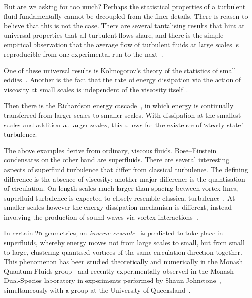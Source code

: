 But are we asking for too much? Perhaps the statistical properties of a turbulent fluid fundamentally cannot be decoupled from the finer details. There is reason to believe that this is not the case. There are several tantalising results that hint at universal properties that all turbulent flows share, and there is the simple empirical observation that the average flow of turbulent fluids at large scales is reproducible from one experimental run to the next~\cite[pp 13, 86]{davidson_turbulence:_2004}.

One of these universal results is Kolmogorov's theory of the statistics of small eddies~\cite{kolmogorov_local_1941, spalding_kolmogorovs_1991}. Another is the fact that the rate of energy dissipation via the action of viscosity at small scales is independent of the viscosity itself~\cite[p 77]{davidson_turbulence:_2004}.

Then there is the Richardson energy cascade~\cite{richardson_weather_2007}, in which energy is continually transferred from larger scales to smaller scales. With dissipation at the smallest scales and addition at larger scales, this allows for the existence of `steady state' turbulence.

The above examples derive from ordinary, viscous fluids. Bose--Einstein condensates on the other hand are superfluids. There are several interesting aspects of superfluid turbulence that differ from classical turbulence. The defining difference is the absence of viscosity; another major difference is the quantisation of circulation. On length scales much larger than spacing between vortex lines, superfluid turbulence is expected to closely resemble classical turbulence~\cite{tsubota_energy_2009}. At smaller scales however the energy dissipation mechanism is different, instead involving the production of sound waves via vortex interactions~\cite{tsubota_energy_2009, vinen_how_2005}.

In certain 2\textsc{d} geometries, an \emph{inverse cascade}~\cite{onsager_statistical_1949, kraichnan_inertial_1967} is predicted to take place in superfluids, whereby energy moves not from large scales to small, but from small to large, clustering quantised vortices of the same circulation direction together. This phenomenon has been studied theoretically and numerically in the Monash Quantum Fluids group~\cite{simula_emergence_2014, groszek_vortex_2018} and recently experimentally observed in the Monash Dual-Species laboratory in experiments performed by Shaun Johnstone~\cite{johnstone_order_2018}, simultaneously with a group at the University of Queensland~\cite{gauthier_negative-temperature_2018}.

